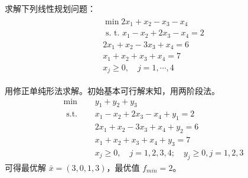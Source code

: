 \begin{problem}
    求解下列线性规划问题：
    \begin{align*}
        \begin{array}{l}
            \min 2 x_{1}+x_{2}-x_{3}-x_{4}\\
            \text { s. t. } x_{1}-x_{2}+2 x_{3}-x_{4}=2 \\
            2 x_{1}+x_{2}-3 x_{3}+x_{4}=6 \\
            x_{1}+x_{2}+x_{3}+x_{4}=7 \\
            x_{j} \geqslant 0, \quad j=1, \cdots, 4
        \end{array}
    \end{align*}
\end{problem}
\begin{solution}
    用修正单纯形法求解。初始基本可行解末知，用两阶段法。
    \begin{align*}
        \min \quad& y_{1}+y_{2}+y_{3} \\
        \text { s.t. } \quad &x_{1}-x_{2}+2 x_{3}-x_{4}+y_{1}  =2 \\
        & 2 x_{1}+x_{2}-3 x_{3}+x_{4}+y_{2}  =6\\
        & x_{1}+x_{2}+x_{3}+x_{4}+y_{3}  =7\\
        &x_{j} \geqslant 0, \quad j=1,2,3,4 ; \quad y_{j} \geqslant 0, j=1,2,3 
    \end{align*}
    可得最优解 $\bar{x} = (3, 0, 1, 3)$，最优值 $f_{min} = 2$。
\end{solution}

